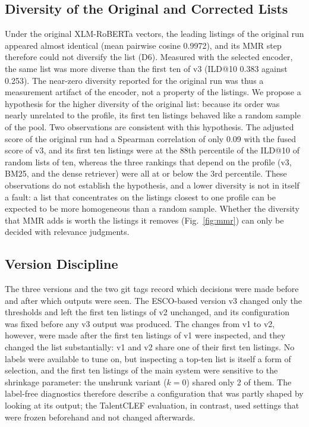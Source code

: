 \documentclass[CHICAGO]{USG}
\begin{document}
\subsection{Diversity of the Original and Corrected Lists}
\label{sec:disc-diversity}
Under the original XLM-RoBERTa vectors, the leading listings of the original run appeared almost identical (mean pairwise cosine 0.9972), and its MMR step therefore could not diversify the list (D6). Measured with the selected encoder, the same list was more diverse than the first ten of v3 (ILD@10 0.383 against 0.253). The near-zero diversity reported for the original run was thus a measurement artifact of the encoder, not a property of the listings. %
We propose a hypothesis for the higher diversity of the original list: because its order was nearly unrelated to the profile, its first ten listings behaved like a random sample of the pool. Two observations are consistent with this hypothesis. The adjusted score of the original run had a Spearman correlation of only 0.09 with the fused score of v3, and its first ten listings were at the 88th percentile of the ILD@10 of random lists of ten, whereas the three rankings that depend on the profile (v3, BM25, and the dense retriever) were all at or below the 3rd percentile. %
These observations do not establish the hypothesis, and a lower diversity is not in itself a fault: a list that concentrates on the listings closest to one profile can be expected to be more homogeneous than a random sample. Whether the diversity that MMR adds is worth the listings it removes (Fig.~\ref{fig:mmr}) can only be decided with relevance judgments.

\subsection{Version Discipline}
\label{sec:disc-versions}
The three versions and the two git tags record which decisions were made before and after which outputs were seen. The ESCO-based version v3 changed only the thresholds and left the first ten listings of v2 unchanged, and its configuration was fixed before any v3 output was produced. %
The changes from v1 to v2, however, were made after the first ten listings of v1 were inspected, and they changed the list substantially: v1 and v2 share one of their first ten listings. %
No labels were available to tune on, but inspecting a top-ten list is itself a form of selection, and the first ten listings of the main system were sensitive to the shrinkage parameter: the unshrunk variant ($k=0$) shared only 2 of them. %
The label-free diagnostics therefore describe a configuration that was partly shaped by looking at its output; the TalentCLEF evaluation, in contrast, used settings that were frozen beforehand and not changed afterwards. %
\end{document}
